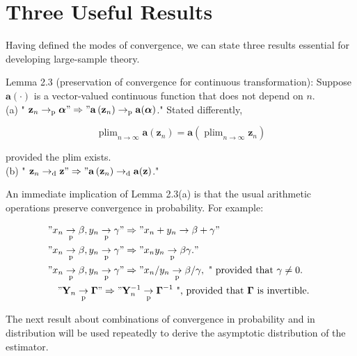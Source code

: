 \documentclass[10pt]{article}
\begin{document}
\section*{Three Useful Results}
Having defined the modes of convergence, we can state three results essential for developing large-sample theory.

Lemma 2.3 (preservation of convergence for continuous transformation): Suppose $\mathbf{a}(\cdot)$ is a vector-valued continuous function that does not depend on $n$.\\
(a) " $\mathbf{z}_{n} \rightarrow_{\mathrm{p}} \boldsymbol{\alpha} " \Rightarrow " \mathbf{a}\left(\mathbf{z}_{n}\right) \rightarrow_{\mathrm{p}} \mathbf{a}(\boldsymbol{\alpha})$." Stated differently,

$$
\operatorname{plim}_{n \rightarrow \infty} \mathbf{a}\left(\mathbf{z}_{n}\right)=\mathbf{a}\left(\operatorname{plim}_{n \rightarrow \infty} \mathbf{z}_{n}\right)
$$

provided the plim exists.\\
(b) " $\mathbf{z}_{n} \rightarrow_{\mathrm{d}} \mathbf{z} " \Rightarrow " \mathbf{a}\left(\mathbf{z}_{n}\right) \rightarrow_{\mathrm{d}} \mathbf{a}(\mathbf{z})$."

An immediate implication of Lemma 2.3(a) is that the usual arithmetic operations preserve convergence in probability. For example:

$$
\begin{aligned}
& " x_{n} \underset{\mathrm{p}}{\rightarrow} \beta, y_{n} \underset{\mathrm{p}}{\rightarrow} \gamma " \Rightarrow " x_{n}+y_{n} \rightarrow \beta+\gamma " \\
& " x_{n} \underset{\mathrm{p}}{\rightarrow} \beta, y_{n} \underset{\mathrm{p}}{\rightarrow} \gamma " \Rightarrow " x_{n} y_{n} \underset{\mathrm{p}}{\rightarrow} \beta \gamma . " \\
& " x_{n} \underset{\mathrm{p}}{\rightarrow} \beta, y_{n} \underset{\mathrm{p}}{\rightarrow} \gamma " \Rightarrow " x_{n} / y_{n} \underset{\mathrm{p}}{\rightarrow} \beta / \gamma, \text { " provided that } \gamma \neq 0 . \\
& \quad " \mathbf{Y}_{n} \underset{\mathrm{p}}{\rightarrow} \boldsymbol{\Gamma} " \Rightarrow " \mathbf{Y}_{n}^{-1} \underset{\mathrm{p}}{\rightarrow} \boldsymbol{\Gamma}^{-1} \text { ", provided that } \boldsymbol{\Gamma} \text { is invertible. }
\end{aligned}
$$

The next result about combinations of convergence in probability and in distribution will be used repeatedly to derive the asymptotic distribution of the estimator.
\end{document}
